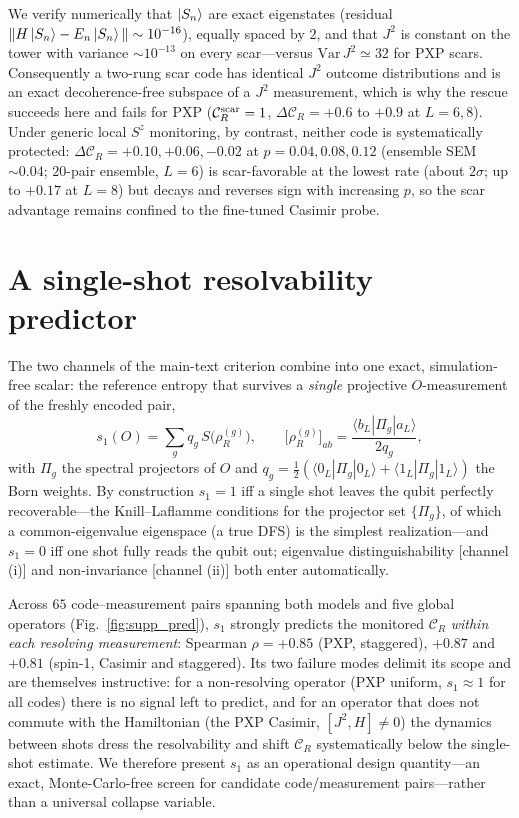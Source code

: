 \documentclass[aps,prxquantum,twocolumn,superscriptaddress,floatfix,longbibliography]{revtex4-2}
\newcommand{\CR}{\mathcal{C}_R}
\begin{document}
We verify numerically that $\ket{S_n}$ are exact eigenstates (residual
$\|H\ket{S_n}-E_n\ket{S_n}\|\sim10^{-16}$), equally spaced by $2$, and that $J^2$
is constant on the tower with variance $\sim10^{-13}$ on every scar---versus
$\mathrm{Var}\,J^2\simeq32$ for PXP scars. Consequently a two-rung scar code has
identical $J^2$ outcome distributions and is an exact decoherence-free subspace
of a $J^2$ measurement, which is why the rescue succeeds here and fails for PXP
($\CR^{\rm scar}=1$, $\Delta\CR=+0.6$ to $+0.9$ at $L=6,8$). Under generic local
$S^z$ monitoring, by contrast, neither code is systematically protected:
$\Delta\CR=+0.10,+0.06,-0.02$ at $p=0.04,0.08,0.12$ (ensemble SEM $\sim0.04$;
$20$-pair ensemble, $L=6$) is scar-favorable at the lowest rate (about
$2\sigma$; up to $+0.17$ at $L=8$) but decays and reverses sign with increasing
$p$, so the scar advantage remains confined to the fine-tuned Casimir probe.

\section{A single-shot resolvability predictor}

The two channels of the main-text criterion combine into one exact,
simulation-free scalar: the reference entropy that survives a \emph{single}
projective $O$-measurement of the freshly encoded pair,
\begin{equation}
s_1(O)=\sum_g q_g\, S\!\big(\rho_R^{(g)}\big),\qquad
\big[\rho_R^{(g)}\big]_{ab} = \frac{\langle b_L|\Pi_g|a_L\rangle}{2q_g},
\end{equation}
with $\Pi_g$ the spectral projectors of $O$ and $q_g=\tfrac12(\langle
0_L|\Pi_g|0_L\rangle+\langle1_L|\Pi_g|1_L\rangle)$ the Born weights. By
construction $s_1=1$ iff a single shot leaves the qubit perfectly
recoverable---the Knill--Laflamme conditions for the projector set
$\{\Pi_g\}$, of which a common-eigenvalue eigenspace (a true DFS) is the
simplest realization---and $s_1=0$ iff one shot fully reads the qubit out;
eigenvalue distinguishability [channel (i)] and non-invariance [channel (ii)]
both enter automatically.

Across $65$ code--measurement pairs spanning both models and five global
operators (Fig.~\ref{fig:supp_pred}), $s_1$ strongly predicts the monitored
$\CR$ \emph{within each resolving measurement}: Spearman $\rho=+0.85$ (PXP,
staggered), $+0.87$ and $+0.81$ (spin-1, Casimir and staggered). Its two
failure modes delimit its scope and are themselves instructive: for a
non-resolving operator (PXP uniform, $s_1\approx1$ for all codes) there is no
signal left to predict, and for an operator that does not commute with the
Hamiltonian (the PXP Casimir, $[J^2,H]\neq0$) the dynamics between shots dress
the resolvability and shift $\CR$ systematically below the single-shot
estimate. We therefore present $s_1$ as an operational design quantity---an
exact, Monte-Carlo-free screen for candidate code/measurement pairs---rather
than a universal collapse variable.
\end{document}
